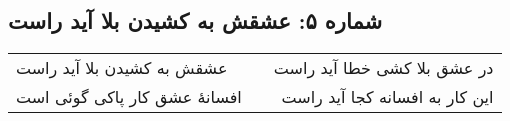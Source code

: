 \begin{center}
\section*{شماره ۵: عشقش به کشیدن بلا آید راست}
\label{sec:005}
\begin{longtable}{l p{0.5cm} r}
عشقش به کشیدن بلا آید راست
&&
در عشق بلا کشی خطا آید راست
\\
افسانهٔ عشق کار پاکی گوئی است
&&
این کار به افسانه کجا آید راست
\\
\end{longtable}
\end{center}

